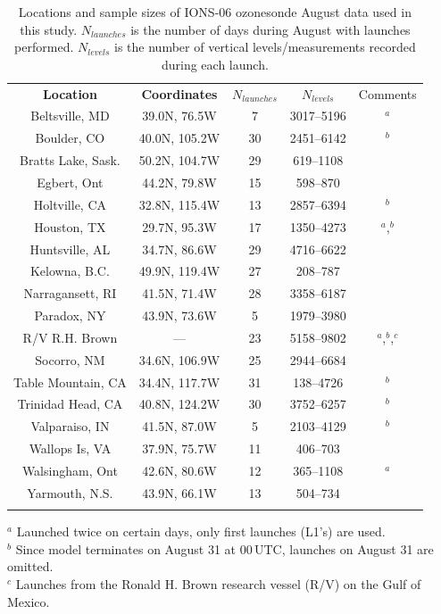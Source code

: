 	\begin{table}[htb]
	\caption[IONS-06 August data usde]{Locations and sample sizes of IONS-06 ozonesonde August data used in this study. $N_{launches}$ is
	the number of days during August with launches performed. $N_{levels}$ is the number of vertical levels/measurements recorded during each
	launch.}
	\begin{center}
	\begin{tabular}{ccccc}\tophline
		{\bf Location} & {\bf Coordinates} & {\bf $N_{launches}$} & {\bf $N_{levels}$} & Comments \\ \middlehline
		Beltsville, MD & 39.0N, 76.5W & 7 & 3017--5196 & ${}^a$ \\
		Boulder, CO & 40.0N, 105.2W & 30 & 2451--6142 & ${}^b$ \\
		Bratts Lake, Sask. & 50.2N, 104.7W & 29 & 619--1108 & \\
		Egbert, Ont & 44.2N, 79.8W & 15 & 598--870 & \\
		Holtville, CA & 32.8N, 115.4W & 13 & 2857--6394 & ${}^b$\\
		Houston, TX & 29.7N, 95.3W & 17 & 1350--4273 & ${}^a$,${}^b$ \\
		Huntsville, AL & 34.7N, 86.6W & 29 & 4716--6622 & \\
		Kelowna, B.C. & 49.9N, 119.4W & 27 & 208--787 & \\
		Narragansett, RI & 41.5N, 71.4W & 28 & 3358--6187 & \\
		Paradox, NY & 43.9N, 73.6W & 5 & 1979--3980 & \\
		R/V R.H. Brown &  --- & 23 & 5158--9802 & ${}^a$,${}^b$,${}^c$ \\
		Socorro, NM & 34.6N, 106.9W & 25 & 2944--6684 & \\
		Table Mountain, CA & 34.4N, 117.7W & 31 & 138--4726 & ${}^b$ \\
		Trinidad Head, CA & 40.8N, 124.2W & 30 & 3752--6257 & ${}^b$ \\
		Valparaiso, IN & 41.5N, 87.0W & 5 & 2103--4129 & ${}^b$ \\
		Wallops Is, VA & 37.9N, 75.7W & 11 & 406--703 & \\
		Walsingham, Ont & 42.6N, 80.6W & 12 & 365--1108 & ${}^a$ \\
		Yarmouth, N.S. & 43.9N, 66.1W & 13 & 504--734 & \\ \bottomhline 
	\end{tabular} \label{table:2006/ions-06}
	\end{center}{
	\footnotesize
	   ${}^a$ Launched twice on certain days, only first launches (L1's) are used.
	\\ ${}^b$ Since model terminates on August 31 at 00\,\unit{UTC}, launches on August 31 are omitted.
	\\ ${}^c$ Launches from the Ronald H. Brown research vessel (R/V) on the Gulf of Mexico.
	}
	\end{table}

